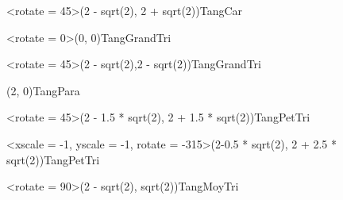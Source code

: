 \documentclass{standalone}
\begin{document}
\begin{EnvTangramTikz}
		\PieceTangram[TangSol]<rotate = 45>({2 - sqrt(2)}, {2 + sqrt(2)}){TangCar}
		
		\PieceTangram[TangSol]<rotate = 0>({0}, {0}){TangGrandTri}
		
		\PieceTangram[TangSol]<rotate = 45>({2 - sqrt(2)},{2 - sqrt(2)}){TangGrandTri}
		
		\PieceTangram[TangSol]({2}, {0}){TangPara}
		
		\PieceTangram[TangSol]<rotate = 45>({2 - 1.5 * sqrt(2)}, {2 + 1.5 * sqrt(2)}){TangPetTri}
		
		\PieceTangram[TangSol]<xscale = -1, yscale = -1, rotate = -315>({2-0.5 * sqrt(2)}, {2 + 2.5 * sqrt(2)}){TangPetTri}
		
		\PieceTangram[TangSol]<rotate = 90>({2 - sqrt(2)}, {sqrt(2)}){TangMoyTri}
\end{EnvTangramTikz}
\end{document}
